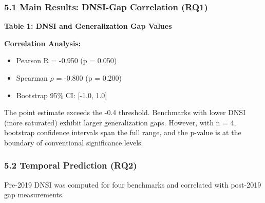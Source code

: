 
\subsubsection{5.1 Main Results: DNSI-Gap Correlation (RQ1)}

\textbf{Table 1: DNSI and Generalization Gap Values}

\begin{table}[htbp]
\centering
{}
\end{table}

\textbf{Correlation Analysis:}
\begin{itemize}
\item Pearson R = -0.950 (p = 0.050)
\item Spearman $\rho$ = -0.800 (p = 0.200)
\item Bootstrap 95\% CI: [-1.0, 1.0]
\end{itemize}

The point estimate exceeds the -0.4 threshold. Benchmarks with lower DNSI (more saturated) exhibit larger generalization gaps. However, with n = 4, bootstrap confidence intervals span the full range, and the p-value is at the boundary of conventional significance levels.

\subsubsection{5.2 Temporal Prediction (RQ2)}

Pre-2019 DNSI was computed for four benchmarks and correlated with post-2019 gap measurements.

\begin{table}[htbp]
\centering
{}
\end{table}

